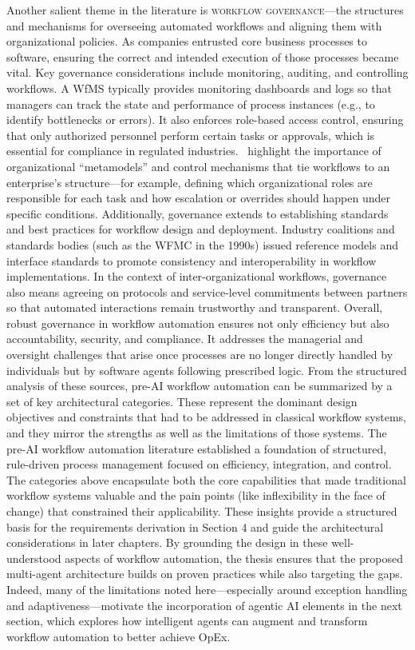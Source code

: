 Another salient theme in the literature is \textsc{workflow governance}—the structures and mechanisms for overseeing automated workflows and aligning them with organizational policies. As companies entrusted core business processes to software, ensuring the correct and intended execution of those processes became vital. Key governance considerations include monitoring, auditing, and controlling workflows. A WfMS typically provides monitoring dashboards and logs so that managers can track the state and performance of process instances (e.g., to identify bottlenecks or errors). It also enforces role-based access control, ensuring that only authorized personnel perform certain tasks or approvals, which is essential for compliance in regulated industries.~\textcite{basuResearch2002} highlight the importance of organizational “metamodels” and control mechanisms that tie workflows to an enterprise's structure---for example, defining which organizational roles are responsible for each task and how escalation or overrides should happen under specific conditions. Additionally, governance extends to establishing standards and best practices for workflow design and deployment. Industry coalitions and standards bodies (such as the WFMC in the 1990s) issued reference models and interface standards to promote consistency and interoperability in workflow implementations. In the context of inter-organizational workflows, governance also means agreeing on protocols and service-level commitments between partners so that automated interactions remain trustworthy and transparent. Overall, robust governance in workflow automation ensures not only efficiency but also accountability, security, and compliance. It addresses the managerial and oversight challenges that arise once processes are no longer directly handled by individuals but by software agents following prescribed logic. From the structured analysis of these sources, pre-AI workflow automation can be summarized by a set of key architectural categories. These represent the dominant design objectives and constraints that had to be addressed in classical workflow systems, and they mirror the strengths as well as the limitations of those systems. The pre-AI workflow automation literature established a foundation of structured, rule-driven process management focused on efficiency, integration, and control. The categories above encapsulate both the core capabilities that made traditional workflow systems valuable and the pain points (like inflexibility in the face of change) that constrained their applicability. These insights provide a structured basis for the requirements derivation in Section 4 and guide the architectural considerations in later chapters. By grounding the design in these well-understood aspects of workflow automation, the thesis ensures that the proposed multi-agent architecture builds on proven practices while also targeting the gaps. Indeed, many of the limitations noted here—especially around exception handling and adaptiveness—motivate the incorporation of agentic AI elements in the next section, which explores how intelligent agents can augment and transform workflow automation to better achieve OpEx.

